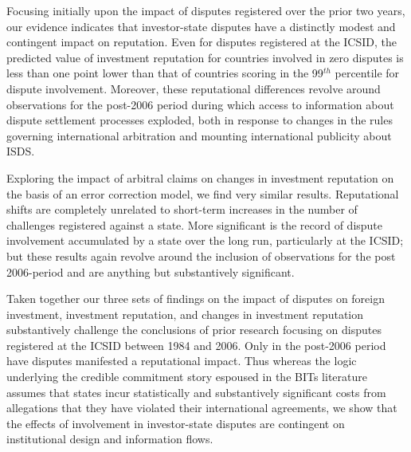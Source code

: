 \documentclass[12pt,onesided]{amsart}
\begin{document}
Focusing initially upon the impact of disputes registered over the prior two years, our evidence indicates that investor-state disputes have a distinctly modest and contingent impact on reputation. Even for disputes registered at the ICSID, the predicted value of investment reputation for countries involved in zero disputes is less than one point lower than that of countries scoring in the 99$^{th}$ percentile for dispute involvement. Moreover, these reputational differences revolve around observations for the post-2006 period during which access to information about dispute settlement processes exploded, both in response to changes in the rules governing international arbitration and mounting international publicity about ISDS. 

Exploring the impact of arbitral claims on changes in investment reputation on the basis of an error correction model, we find very similar results. Reputational shifts are completely unrelated to short-term increases in the number of challenges registered against a state. More significant is the record of dispute involvement accumulated by a state over the long run, particularly at the ICSID; but these results again revolve around the inclusion of observations for the post 2006-period and are anything but substantively significant.

Taken together our three sets of findings on the impact of disputes on foreign investment, investment reputation, and changes in investment reputation substantively challenge the conclusions of prior research focusing on disputes registered at the ICSID between 1984 and 2006. Only in the post-2006 period have disputes manifested a reputational impact. Thus whereas the logic underlying the credible commitment story espoused in the BITs literature assumes that states incur statistically and substantively significant costs from allegations that they have violated their international agreements, we show that the effects of involvement in investor-state disputes are contingent on institutional design and information flows.
\end{document}
